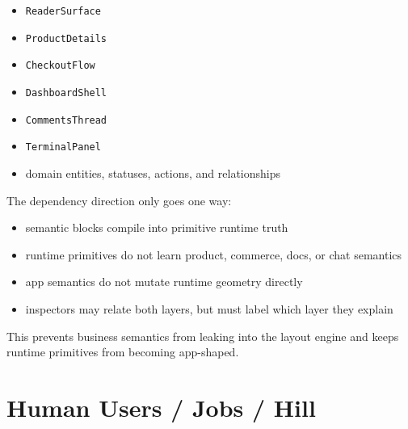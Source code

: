 \begin{itemize}
\tightlist
\item
  \texttt{R\allowbreak{}e\allowbreak{}a\allowbreak{}d\allowbreak{}e\allowbreak{}r\allowbreak{}S\allowbreak{}u\allowbreak{}r\allowbreak{}f\allowbreak{}a\allowbreak{}c\allowbreak{}e}
\item
  \texttt{P\allowbreak{}r\allowbreak{}o\allowbreak{}d\allowbreak{}u\allowbreak{}c\allowbreak{}t\allowbreak{}D\allowbreak{}e\allowbreak{}t\allowbreak{}a\allowbreak{}i\allowbreak{}l\allowbreak{}s}
\item
  \texttt{C\allowbreak{}h\allowbreak{}e\allowbreak{}c\allowbreak{}k\allowbreak{}o\allowbreak{}u\allowbreak{}t\allowbreak{}F\allowbreak{}l\allowbreak{}o\allowbreak{}w}
\item
  \texttt{D\allowbreak{}a\allowbreak{}s\allowbreak{}h\allowbreak{}b\allowbreak{}o\allowbreak{}a\allowbreak{}r\allowbreak{}d\allowbreak{}S\allowbreak{}h\allowbreak{}e\allowbreak{}l\allowbreak{}l}
\item
  \texttt{C\allowbreak{}o\allowbreak{}m\allowbreak{}m\allowbreak{}e\allowbreak{}n\allowbreak{}t\allowbreak{}s\allowbreak{}T\allowbreak{}h\allowbreak{}r\allowbreak{}e\allowbreak{}a\allowbreak{}d}
\item
  \texttt{T\allowbreak{}e\allowbreak{}r\allowbreak{}m\allowbreak{}i\allowbreak{}n\allowbreak{}a\allowbreak{}l\allowbreak{}P\allowbreak{}a\allowbreak{}n\allowbreak{}e\allowbreak{}l}
\item
  domain entities, statuses, actions, and relationships
\end{itemize}

The dependency direction only goes one way:

\begin{itemize}
\tightlist
\item
  semantic blocks compile into primitive runtime truth
\item
  runtime primitives do not learn product, commerce, docs, or chat semantics
\item
  app semantics do not mutate runtime geometry directly
\item
  inspectors may relate both layers, but must label which layer they explain
\end{itemize}

This prevents business semantics from leaking into the layout engine and keeps runtime primitives from becoming app-shaped.

\section{Human Users / Jobs / Hill}\label{record-128-human-users-jobs-hill}

